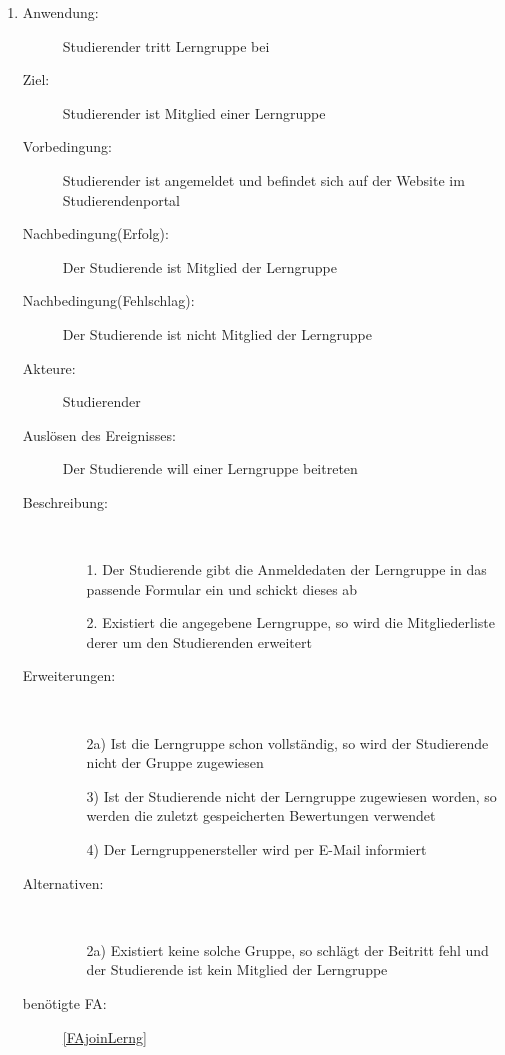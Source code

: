 \documentclass[parskip=full]{scrartcl}
\newcommand{\swtLabel}[1]{\textbf{/#1\arabic*0/}}
\begin{document}
\begin{enumerate}[label=\swtLabel{S}]
  
  \item
  \begin{description}
  \item[Anwendung:] Studierender tritt Lerngruppe bei
  \item[Ziel:] Studierender ist Mitglied einer Lerngruppe
  	\item[Vorbedingung:] Studierender ist angemeldet und befindet sich auf der
  	Website im Studierendenportal
  	\item[Nachbedingung(Erfolg):] Der Studierende ist Mitglied der Lerngruppe
  	\item[Nachbedingung(Fehlschlag):] Der Studierende ist nicht Mitglied der
  	Lerngruppe
  	\item[Akteure:] Studierender
  	\item[Auslösen des Ereignisses:] Der Studierende will einer Lerngruppe beitreten
  	\item[Beschreibung:]~
  	\begin{enumerate}
  	  \item[1.] Der Studierende gibt die Anmeldedaten der Lerngruppe in das
  	  passende Formular ein und schickt dieses ab %
  	  \item[2.] Existiert die angegebene Lerngruppe, so wird die Mitgliederliste
  	  derer um den Studierenden erweitert
  	\end{enumerate}
  	\item[Erweiterungen:]~
  	\begin{enumerate}
  	  \item[2a)] Ist die Lerngruppe schon vollständig, so wird der Studierende nicht
  	  der Gruppe zugewiesen
  	  \item[3)] Ist der Studierende nicht der Lerngruppe zugewiesen worden, so werden
  	  die zuletzt gespeicherten Bewertungen verwendet
  	  \item[4)] Der Lerngruppenersteller wird per E-Mail informiert
  	 \end{enumerate}
  	\item[Alternativen:] ~
  	\begin{enumerate}
  	  \item[2a)] Existiert keine solche Gruppe, so schlägt der Beitritt fehl und
  	  der Studierende ist kein Mitglied der Lerngruppe
  	 \end{enumerate}
  	 \item[benötigte FA:] \ref{FAjoinLerng}
  \end{description}
%   
  

\end{enumerate}
\end{document}
